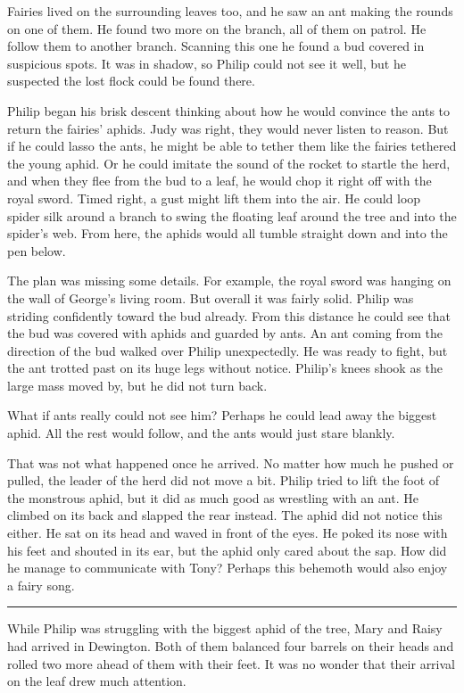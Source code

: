 \documentclass[10pt]{memoir}
\renewcommand{\pfbreakdisplay}{\bigskip \ding{166} \bigskip}
\newcommand{\secbreak}{\fancybreak{\pfbreakdisplay}}
\begin{document}
Fairies lived on the surrounding leaves too, and he saw an ant making the
rounds on one of them. He found two more on the branch, all of them on patrol.
He follow them to another branch. Scanning this one he found a bud covered in
suspicious spots. It was in shadow, so Philip could not see it well, but he
suspected the lost flock could be found there.

Philip began his brisk descent thinking about how he would convince the ants to
return the fairies' aphids. Judy was right, they would never listen to reason.
But if he could lasso the ants, he might be able to tether them like the
fairies tethered the young aphid. Or he could imitate the sound of the rocket
to startle the herd, and when they flee from the bud to a leaf, he would chop
it right off with the royal sword. Timed right, a gust might lift them into the
air. He could loop spider silk around a branch to swing the floating leaf
around the tree and into the spider's web. From here, the aphids would all
tumble straight down and into the pen below.

The plan was missing some details. For example, the royal sword was hanging on
the wall of George's living room. But overall it was fairly solid. Philip was
striding confidently toward the bud already. From this distance he could see
that the bud was covered with aphids and guarded by ants. An ant coming from
the direction of the bud walked over Philip unexpectedly. He was ready to
fight, but the ant trotted past on its huge legs without notice. Philip's knees
shook as the large mass moved by, but he did not turn back.

What if ants really could not see him? Perhaps he could lead away the biggest
aphid. All the rest would follow, and the ants would just stare blankly.

That was not what happened once he arrived. No matter how much he pushed or
pulled, the leader of the herd did not move a bit. Philip tried to lift the
foot of the monstrous aphid, but it did as much good as wrestling with an ant.
He climbed on its back and slapped the rear instead. The aphid did not notice
this either. He sat on its head and waved in front of the eyes. He poked its
nose with his feet and shouted in its ear, but the aphid only cared about the
sap. How did he manage to communicate with Tony? Perhaps this behemoth would
also enjoy a fairy song.

\secbreak

While Philip was struggling with the biggest aphid of the tree, Mary and Raisy
had arrived in Dewington. Both of them balanced four barrels on their heads
and rolled two more ahead of them with their feet. It was no wonder that their
arrival on the leaf drew much attention.
\end{document}
